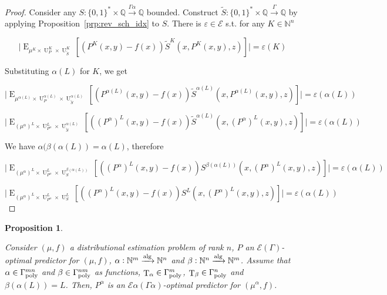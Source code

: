 \documentclass{article}
\numberwithin{equation}{section}
\theoremstyle{definition}
\theoremstyle{plain}
\newtheorem{proposition}{Proposition}[section]
\newcommand{\Bool}{\{0,1\}}
\newcommand{\Words}{{\Bool^*}}
\DeclareMathOperator{\E}{E}
\DeclareMathOperator{\T}{T}
\DeclareMathOperator{\Un}{U}
\newcommand{\Nats}{\mathbb{N}}
\newcommand{\Rats}{\mathbb{Q}}
\newcommand{\Abs}[1]{\lvert #1 \rvert}
\newcommand{\Fall}{\mathcal{E}}
\newcommand{\EG}{\Fall(\Gamma)}
\newcommand{\Alg}{\xrightarrow{\textnormal{alg}}}
\newcommand{\Scheme}{\xrightarrow{\Gamma}}
\begin{document}
\begin{proof}

Consider any ${S: \Words \times \Rats \xrightarrow{\Gamma \alpha} \Rats}$ bounded. Construct ${\tilde{S}: \Words \times \Rats \Scheme \Rats}$ by applying Proposition~\ref{prp:rev_sch_idx} to ${S}$. There is ${\varepsilon \in \Fall}$ s.t. for any ${K \in \Nats^n}$

\[\Abs{\E_{\mu^{K} \times \Un_P^K \times \Un_{\tilde{S}}^K}[(P^K(x,y) - f(x))\tilde{S}^K(x,P^K(x,y),z)]}=\varepsilon(K)\]

Substituting ${\alpha(L)}$ for ${K}$, we get

\[\Abs{\E_{\mu^{\alpha(L)} \times \Un_P^{\alpha(L)} \times \Un_{\tilde{S}}^{\alpha(L)}}[(P^{\alpha(L)}(x,y) - f(x))\tilde{S}^{\alpha(L)}(x,P^{\alpha(L)}(x,y),z)]}=\varepsilon(\alpha(L))\]

\[\Abs{\E_{(\mu^\alpha)^{L} \times \Un_{P^\alpha}^{L} \times \Un_{\tilde{S}}^{\alpha(L)}}[((P^\alpha)^{L}(x,y) - f(x))\tilde{S}^{\alpha(L)}(x,(P^\alpha)^{L}(x,y),z)]}=\varepsilon(\alpha(L))\]

We have ${\alpha(\beta(\alpha(L))=\alpha(L)}$, therefore

\[\Abs{\E_{(\mu^\alpha)^{L} \times \Un_{P^\alpha}^{L} \times \Un_{S}^{\beta(\alpha(L))}}[((P^\alpha)^{L}(x,y) - f(x))S^{\beta(\alpha(L))}(x,(P^\alpha)^{L}(x,y),z)]}=\varepsilon(\alpha(L))\]

\[\Abs{\E_{(\mu^\alpha)^{L} \times \Un_{P^\alpha}^{L} \times \Un_{S}^{L}}[((P^\alpha)^{L}(x,y) - f(x))S^{L}(x,(P^\alpha)^{L}(x,y),z)]}=\varepsilon(\alpha(L))\]
%
\end{proof}

\begin{samepage}
\begin{proposition}
\label{prp:idx_reduce}

Consider $(\mu,f)$ a distributional estimation problem of rank ${n}$, ${P}$ an ${\EG}$-optimal predictor for ${(\mu,f)}$, ${\alpha: \Nats^m \Alg \Nats^n}$ and ${\beta: \Nats^n \Alg \Nats^m}$. Assume that ${\alpha \in \Gamma_{\textnormal{poly}}^{mn}}$ and ${\beta \in \Gamma_{\textnormal{poly}}^{nm}}$ as functions, ${\T_\alpha \in \Gamma_{\textnormal{poly}}^m}$, ${\T_\beta \in \Gamma_{\textnormal{poly}}^n}$ and ${\beta(\alpha(L))=L}$. Then, ${P^\alpha}$ is an ${\Fall \alpha(\Gamma \alpha)}$-optimal predictor for ${(\mu^\alpha,f)}$.

\end{proposition}
\end{samepage}
\end{document}
